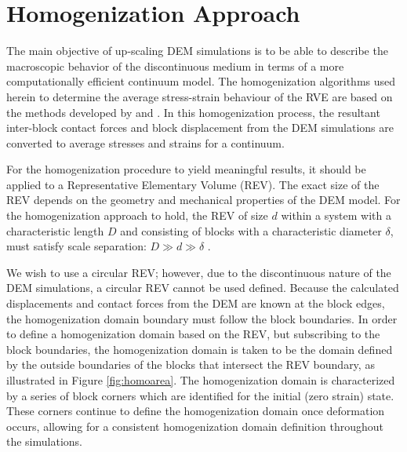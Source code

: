 \section{Homogenization Approach}

The main objective of up-scaling DEM simulations is to be able to describe the macroscopic behavior of the discontinuous medium in terms of a more computationally efficient continuum model. The homogenization algorithms used herein to determine the average stress-strain behaviour of the RVE are based on the methods developed by \citet{daddetta_particle_2004} and \citet{wellmann_homogenization_2008}. In this homogenization process, the resultant inter-block contact forces and block displacement from the DEM simulations are converted to average stresses and strains for a continuum.

For the homogenization procedure to yield meaningful results, it should be applied to a Representative Elementary Volume (REV). The exact size of the REV depends on the geometry and mechanical properties of the DEM model. For the homogenization approach to hold, the REV of size $d$ within a system with a characteristic length $D$ and consisting of blocks with a characteristic diameter $\delta$, must satisfy scale separation: $D\gg d\gg\delta$ \citep{wellmann_homogenization_2008}. 

We wish to use a circular REV; however, due to the discontinuous nature of the DEM simulations, a circular REV cannot be used defined. Because the calculated displacements and contact forces from the DEM are known at the block edges, the homogenization domain boundary must follow the block boundaries. In order to define a homogenization domain based on the REV, but subscribing to the block boundaries, the homogenization domain is taken to be the domain defined by the outside boundaries of the blocks that intersect the REV boundary, as illustrated in Figure \ref{fig:homoarea}. The homogenization domain is characterized by a series of block corners which are identified for the initial (zero strain) state. These corners continue to define the homogenization domain once deformation occurs, allowing for a consistent homogenization domain definition throughout the simulations. 

